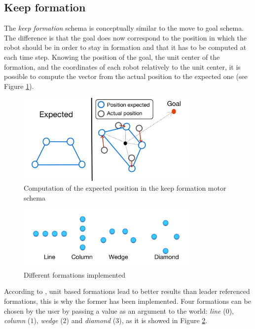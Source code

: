 \documentclass[journal]{IEEEtran}
\begin{document}
\subsection{Keep formation}
The \textit{keep formation} schema is conceptually similar to the move to goal schema. The difference is that the goal does now correspond to the position in which the robot should be in order to stay in formation and that it has to be computed at each time step. Knowing the position of the goal, the unit center of the formation, and the coordinates of each robot relatively to the unit center, it is possible to compute the vector from the actual position to the expected one (see Figure \ref{img:keep_formation}). 
\begin{figure}[!t]
\centering
\includegraphics[width=3.5in]{Images/keep_formation.jpg}
\caption{Computation of the expected position in the keep formation motor schema}
\label{img:keep_formation}
\end{figure}
\begin{figure}[!t]
\centering
\includegraphics[width=3.5in]{Images/formation.jpg}
\caption{Different formations implemented}
\label{img:formation}
\end{figure}

According to \cite{IEEEhowto:balch_behaviour_based}, unit based formations lead to better results than leader referenced formations, this is why the former has been implemented. Four formations can be chosen by the user by passing a value as an argument to the world: \textit{line} ($0$), \textit{column} ($1$), \textit{wedge} ($2$) and \textit{diamond} ($3$), as it is showed in Figure \ref{img:formation}. 
\end{document}
